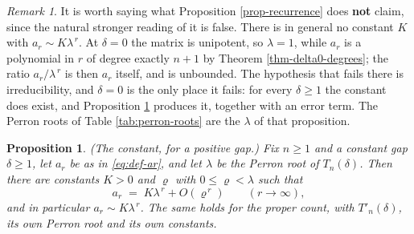 \documentclass[11pt, a4paper, abstract=yes]{scrartcl}
\theoremstyle{definition}
\theoremstyle{remark}
\newtheorem{remark}[definition]{Remark}
\theoremstyle{plain}
\newtheorem{proposition}[definition]{Proposition}
\begin{document}
\begin{remark}
It is worth saying what Proposition \ref{prop-recurrence} does \textbf{not} claim, since the natural stronger
reading of it is false. There is in general no constant \(K\) with \(a_r\sim K\lambda^{\,r}\). At
\(\delta=0\) the matrix is unipotent, so \(\lambda=1\), while \(a_r\) is a polynomial in \(r\) of
degree exactly \(n+1\) by Theorem \ref{thm-delta0-degrees}; the ratio \(a_r/\lambda^{\,r}\) is then
\(a_r\) itself, and is unbounded. The hypothesis that fails there is irreducibility, and
\(\delta=0\) is the only place it fails: for every \(\delta\ge1\) the constant does exist, and
Proposition \ref{prop-growth-constant} produces it, together with an error term. The Perron roots of
Table \ref{tab:perron-roots} are the \(\lambda\) of that proposition.
\label{rem-recurrence-not-asymptotic}
\end{remark}

\begin{proposition}
(\emph{The constant, for a positive gap.}) Fix \(n\ge1\) and a constant gap \(\delta\ge1\), let \(a_r\) be
as in \eqref{eq:def-ar}, and let \(\lambda\) be the Perron root of \(T_n(\delta)\). Then there are
constants \(K>0\) and \(\varrho\) with \(0\le\varrho<\lambda\) such that
\begin{equation}\label{eq:growth-constant}
  a_r\;=\;K\lambda^{\,r}+O(\varrho^{\,r})\qquad(r\to\infty) ,
\end{equation}
and in particular \(a_r\sim K\lambda^{\,r}\). The same holds for the proper count, with
\(T'_n(\delta)\), its own Perron root and its own constants.
\label{prop-growth-constant}
\end{proposition}
\end{document}
